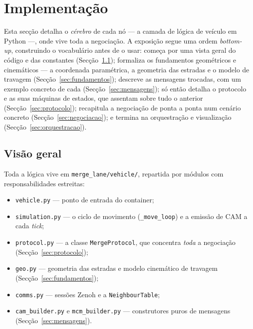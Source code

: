 \documentclass[11pt,a4paper]{article}
\begin{document}
\section{Implementação}
\label{sec:implementacao}

Esta secção detalha o \emph{cérebro} de cada nó --- a camada de lógica de veículo em
Python ---, onde vive toda a negociação. A exposição segue uma ordem \emph{bottom-up},
construindo o vocabulário antes de o usar: começa por uma vista geral do código e das
constantes (Secção~\ref{sec:visao-geral}); formaliza os fundamentos geométricos e
cinemáticos --- a coordenada paramétrica, a geometria das estradas e o modelo de travagem
(Secção~\ref{sec:fundamentos}); descreve as mensagens trocadas, com um exemplo concreto de
cada (Secção~\ref{sec:mensagens}); só então detalha o protocolo e as suas máquinas de
estados, que assentam sobre tudo o anterior (Secção~\ref{sec:protocolo}); recapitula a
negociação de ponta a ponta num cenário concreto (Secção~\ref{sec:negociacao}); e termina
na orquestração e visualização (Secção~\ref{sec:orquestracao}).

\subsection{Visão geral}
\label{sec:visao-geral}

Toda a lógica vive em \texttt{merge\_lane/vehicle/}, repartida por módulos com
responsabilidades estreitas:
\begin{itemize}[noitemsep,topsep=2pt]
  \item \texttt{vehicle.py} --- ponto de entrada do container;
  \item \texttt{simulation.py} --- o ciclo de movimento (\texttt{\_move\_loop}) e a emissão
        de CAM a cada \emph{tick};
  \item \texttt{protocol.py} --- a classe \texttt{MergeProtocol}, que concentra \emph{toda}
        a negociação (Secção~\ref{sec:protocolo});
  \item \texttt{geo.py} --- geometria das estradas e modelo cinemático de travagem
        (Secção~\ref{sec:fundamentos});
  \item \texttt{comms.py} --- sessões Zenoh e a \texttt{NeighbourTable};
  \item \texttt{cam\_builder.py} e \texttt{mcm\_builder.py} --- construtores puros de
        mensagens (Secção~\ref{sec:mensagens}).
\end{itemize}
\end{document}
